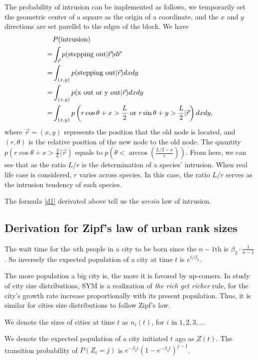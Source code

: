 \documentclass[aps,prl]{revtex4-1}
\begin{document}
The probability of intrusion can be implemented as follows, we temporarily set the geometric center of a square as the origin of a coordinate, and the $x$ and $y$ directions are set parellel to the edges of the block. We have 
\begin{align}
&P(\text{intrusion}) \\=& \int_{\vec{r}} p(\text{stepping out}|\vec{r})d\vec{r}\label{d1}\\
=& \int_{(x,y)} p(\text{stepping out}|\vec{r})dxdy    \notag \\
=& \int_{(x,y)}p(\text{x out or y out}|\vec{r})dxdy\notag
\\
=& \int_{(x,y)}p\left(r\cos\theta+x>\frac{L}{2}\text{ or }r\sin\theta+y>\frac{L}{2}|\vec{r}\right)dxdy,
\end{align}
where $\vec{r}=(x,y)$ represents the position that the old node is located, and $(r,\theta)$ is the relative position of the new node to the old node. The quantity $p\left(r\cos\theta+x>\frac{2}{L}|\vec{r}\right)$ equals to $p\left(\theta<\arccos\left(\frac{L/2-x}{r}\right)\right)$. From here, we can see that as the ratio $L/r$ is the determination of a species' intrusion. When  real life case is considered, $r$ varies across species. In this case, the ratio $L/r$ serves as the intrusion tendency of each species. 

The formula \ref{d1} derivated above tell us the \emph{arcsin} law of intrusion.

\subsection{Derivation for Zipf's law of urban rank sizes}

The wait time for the $n$th people in a city to be born since the $n-1$th is $\beta_2 \cdot \frac{1}{n-1}$. So inversely the expected population of a city at time $t$ is $e^{t/\beta_2}$. 

The more population a big city is, the more it is favored by up-comers. In study of city size distributions, SYM is a realization of \emph{the rich get richer} rule, for the city's growth rate increase proportionally with its present population. Thus, it is similar for cities size distributions to follow Zipf's law. 

We denote the sizes of cities at time $t$ as $n_i(t)$, for $i$ in $1,2,3,\dots$

We denote the expected population of a city initiated $t$ ago as $Z(t)$. The transition probability of $P(Z_t = j)$ is $e^{-\beta_2 t}(1-e^{-\beta_2 t})^{j-1}$. 
\end{document}
